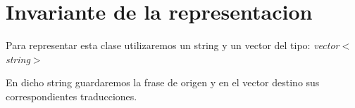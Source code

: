 \hypertarget{repFrase_invFrase}{}\section{Invariante de la representacion}\label{repFrase_invFrase}
Para representar esta clase utilizaremos un string y un vector del tipo\+: {\itshape vector$<$string$>$} 

En dicho string guardaremos la frase de origen y en el vector destino sus correspondientes traducciones. 